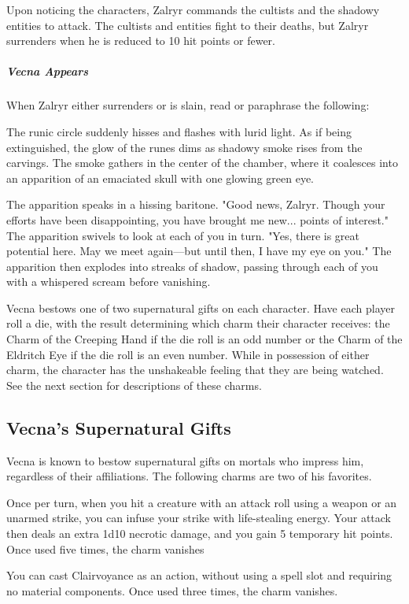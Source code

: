 \documentclass[10pt,a4paper,twoside,bg=print,twocolumn,openany,nodeprecatedcode]{dndbook}
\begin{document}
Upon noticing the characters, Zalryr commands the cultists and the shadowy entities to attack. The cultists and entities fight to their deaths, but Zalryr surrenders when he is reduced to 10 hit points or fewer.
\subparagraph{Vecna Appears}
When Zalryr either surrenders or is slain, read or paraphrase the following:
\begin{DndReadAloud}{}
The runic circle suddenly hisses and flashes with lurid light. As if being extinguished, the glow of the runes dims as shadowy smoke rises from the carvings. The smoke gathers in the center of the chamber, where it coalesces into an apparition of an emaciated skull with one glowing green eye.

The apparition speaks in a hissing baritone. "Good news, Zalryr. Though your efforts have been disappointing, you have brought me new... points of interest." The apparition swivels to look at each of you in turn. "Yes, there is great potential here. May we meet again—but until then, I have my eye on you." The apparition then explodes into streaks of shadow, passing through each of you with a whispered scream before vanishing.
\end{DndReadAloud}

Vecna bestows one of two supernatural gifts on each character. Have each player roll a die, with the result determining which charm their character receives: the Charm of the Creeping Hand if the die roll is an odd number or the Charm of the Eldritch Eye if the die roll is an even number. While in possession of either charm, the character has the unshakeable feeling that they are being watched. See the next section for descriptions of these charms.
\subsection{Vecna's Supernatural Gifts}
Vecna is known to bestow supernatural gifts on mortals who impress him, regardless of their affiliations. The following charms are two of his favorites.

Once per turn, when you hit a creature with an attack roll using a weapon or an unarmed strike, you can infuse your strike with life-stealing energy. Your attack then deals an extra 1d10 necrotic damage, and you gain 5 temporary hit points. Once used five times, the charm vanishes

You can cast Clairvoyance as an action, without using a spell slot and requiring no material components. Once used three times, the charm vanishes.
\end{document}
